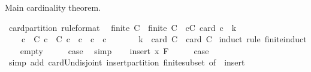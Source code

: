 \begin{isabellebody}
%
\endisadelimproof
%
\begin{isamarkuptext}%
Main cardinality theorem.%
\end{isamarkuptext}\isamarkuptrue%
\isamarkupfalse%
\ card{\isacharunderscore}{\kern0pt}partition\ {\isacharbrackleft}{\kern0pt}rule{\isacharunderscore}{\kern0pt}format{\isacharbrackright}{\kern0pt}{\isacharcolon}{\kern0pt}\isanewline
\ \ {\isachardoublequoteopen}finite\ C\ {\isasymLongrightarrow}\ finite\ {\isacharparenleft}{\kern0pt}{\isasymUnion}C{\isacharparenright}{\kern0pt}\ {\isasymLongrightarrow}\ {\isacharparenleft}{\kern0pt}{\isasymforall}c{\isasymin}C{\isachardot}{\kern0pt}\ card\ c\ {\isacharequal}{\kern0pt}\ k{\isacharparenright}{\kern0pt}\ {\isasymLongrightarrow}\isanewline
\ \ \ \ {\isacharparenleft}{\kern0pt}{\isasymforall}c{}\ {\isasymin}\ C{\isachardot}{\kern0pt}\ {\isasymforall}c{}\ {\isasymin}\ C{\isachardot}{\kern0pt}\ c{}\ {\isasymnoteq}\ c{}\ {\isasymlongrightarrow}\ c{}\ {\isasyminter}\ c{}\ {\isacharequal}{\kern0pt}\ {\isacharbraceleft}{\kern0pt}{\isacharbraceright}{\kern0pt}{\isacharparenright}{\kern0pt}\ {\isasymLongrightarrow}\isanewline
\ \ \ \ k\ {\isacharasterisk}{\kern0pt}\ card\ C\ {\isacharequal}{\kern0pt}\ card\ {\isacharparenleft}{\kern0pt}{\isasymUnion}C{\isacharparenright}{\kern0pt}{\isachardoublequoteclose}\isanewline
%
\isadelimproof
%
\endisadelimproof
%
\isatagproof
{}\isamarkupfalse%
\ {\isacharparenleft}{\kern0pt}induct\ rule{\isacharcolon}{\kern0pt}\ finite{\isacharunderscore}{\kern0pt}induct{\isacharparenright}{\kern0pt}\isanewline
\ \ \isamarkupfalse%
\ empty\isanewline
\ \ \isamarkupfalse%
\ \isamarkupfalse%
\ {\isacharquery}{\kern0pt}case\ \isamarkupfalse%
\ simp\isanewline
{}\isamarkupfalse%
\isanewline
\ \ \isamarkupfalse%
\ {\isacharparenleft}{\kern0pt}insert\ x\ F{\isacharparenright}{\kern0pt}\isanewline
\ \ \isamarkupfalse%
\ \isamarkupfalse%
\ {\isacharquery}{\kern0pt}case\isanewline
\ \ \ \ \isamarkupfalse%
\ {\isacharparenleft}{\kern0pt}simp\ add{\isacharcolon}{\kern0pt}\ card{\isacharunderscore}{\kern0pt}Un{\isacharunderscore}{\kern0pt}disjoint\ insert{\isacharunderscore}{\kern0pt}partition\ finite{\isacharunderscore}{\kern0pt}subset\ {\isacharbrackleft}{\kern0pt}of\ {\isacharunderscore}{\kern0pt}\ {\isachardoublequoteopen}{\isasymUnion}{\isacharparenleft}{\kern0pt}insert\ {\isacharunderscore}{\kern0pt}\ {\isacharunderscore}{\kern0pt}{\isacharparenright}{\kern0pt}{\isachardoublequoteclose}{\isacharbrackright}{\kern0pt}{\isacharparenright}{\kern0pt}\isanewline

\end{isabellebody}
